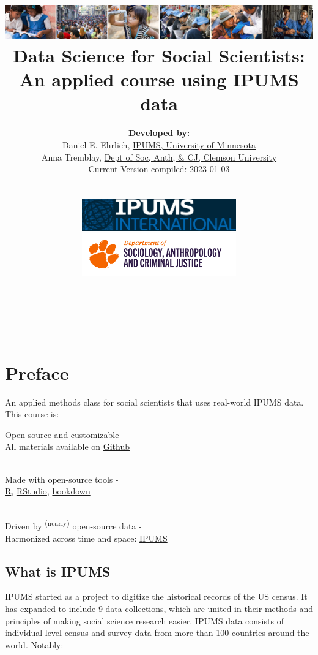 \documentclass[
]{book}
\title{\includegraphics{ipums_banner.png}\\
Data Science for Social Scientists:\\
An applied course using IPUMS data }
\author{\textbf{Developed by:}\\
\hspace*{0.333em}\hspace*{0.333em}Daniel E. Ehrlich, \href{https://international.ipums.org/international/}{IPUMS, University of Minnesota}\\
\hspace*{0.333em}\hspace*{0.333em}Anna Tremblay, \href{https://www.clemson.edu/cbshs/departments/sacj/degrees/anthropology.html}{Dept of Soc, Anth, \& CJ, Clemson University}\\
\hspace*{0.333em}\hspace*{0.333em}Current Version compiled: 2023-01-03\\
\strut \\
\includegraphics[width=0.5\textwidth,height=\textheight]{ipums_i_logo.jpg}\\
\includegraphics[width=0.5\textwidth,height=\textheight]{clemson_logo.png}\\
\strut \\
\strut \\}
\date{}
\begin{document}
\maketitle

{
\setcounter{tocdepth}{1}
\tableofcontents
}
\hypertarget{preface}{%
\chapter*{Preface}\label{preface}}

An applied methods class for social scientists that uses real-world IPUMS data. This course is:

Open-source and customizable -\\
\hspace*{0.333em}\hspace*{0.333em}\hspace*{0.333em}All materials available on \href{https://github.com/ehrlichd/stats_book}{Github}\\
\strut \\
Made with open-source tools -\\
\hspace*{0.333em}\hspace*{0.333em}\href{https://cran.r-project.org/}{R}, \href{https://www.rstudio.com/products/rstudio/}{RStudio}, \href{https://bookdown.org/}{bookdown}\\
\strut \\
Driven by \textsuperscript{(nearly)} open-source data -\\
\hspace*{0.333em}\hspace*{0.333em}Harmonized across time and space: \href{https://ipums.org}{IPUMS}\\

\hypertarget{what-is-ipums}{%
\section*{What is IPUMS}\label{what-is-ipums}}

IPUMS started as a project to digitize the historical records of the US census.
It has expanded to include \href{https://www.ipums.org/}{9 data collections},
which are united in their methods and principles of making social science
research easier. IPUMS data consists of individual-level census and survey data
from more than 100 countries around the world. Notably:
\end{document}
